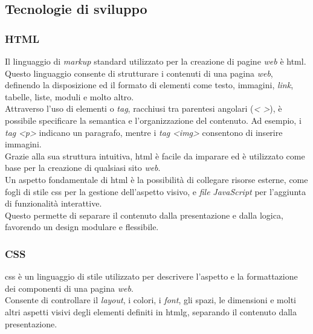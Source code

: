 \subsection{Tecnologie di sviluppo}
\label{sez:tecnologie-sviluppo}

\subsubsection{HTML}

Il linguaggio di \textit{markup} standard utilizzato per la creazione di pagine \textit{web} è \gls{html}. \\
Questo linguaggio consente di strutturare i contenuti di una pagina \textit{web}, definendo la disposizione ed il formato di elementi come testo, immagini, \textit{link}, tabelle, liste, moduli e molto altro.\\

\noindent Attraverso l’uso di elementi o \textit{tag}, racchiusi tra parentesi angolari (\textit{< >}), è possibile specificare la semantica e l’organizzazione del contenuto. 
Ad esempio, i \textit{tag} \textit{<p>} indicano un paragrafo, mentre i \textit{tag} \textit{<img>} consentono di inserire immagini. \\
Grazie alla sua struttura intuitiva, \gls{html} è facile da imparare ed è utilizzato come base per la creazione di qualsiasi sito \textit{web}.\\

\noindent Un aspetto fondamentale di \gls{html} è la possibilità di collegare risorse esterne, come fogli di stile \gls{css} per la gestione dell’aspetto visivo, e \textit{file} \textit{JavaScript} per l’aggiunta di funzionalità interattive. \\
Questo permette di separare il contenuto dalla presentazione e dalla logica, favorendo un design modulare e flessibile.

\subsubsection{CSS}
\gls{css} è un linguaggio di stile utilizzato per descrivere l’aspetto e la formattazione dei componenti di una pagina \textit{web}. \\
Consente di controllare il \textit{layout}, i colori, i \textit{font}, gli spazi, le dimensioni e molti altri aspetti visivi degli elementi definiti in \gls{htmlg}, separando il contenuto dalla presentazione.\\

